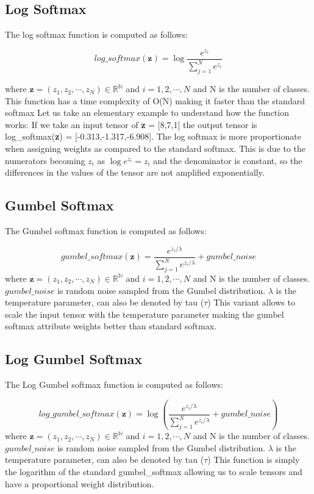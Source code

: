 \documentclass{article}
\begin{document}
\subsection{Log Softmax}
The log softmax function is computed as follows:

\[log\_softmax(\textbf{z}) = \log{\frac{e^{z_i}}{\sum_{j=1}^{N} e^{z_i}}}\]

where $\textbf{z} = (z_1,z_2,\cdots,z_N) \in \mathbb{R^N}$ and $i = 1,2,\cdots,N$ and N is the number of classes.
\newline
\newline
    This function has a time complexity of O(N) making it faster than the standard softmax
\newline
    Let us take an elementary example to understand how the function works:
    If we take an input tensor of \textbf{z} = [8,7,1] the output tensor is log\_softmax(\textbf{z}) = [-0.313,-1.317,-6.908]. The log softmax is more proportionate when assigning weights as compared to the standard softmax.
    This is due to the numerators becoming $z_i$ as $\log{e^{z_i} = z_i}$ and the denominator is constant, so the differences in the values of the tensor are not amplified exponentially.

\subsection{Gumbel Softmax}
The Gumbel softmax function is computed as follows:

\[gumbel\_softmax(\textbf{z}) = \frac{e^{z_i/\lambda}}{\sum_{j=1}^{N} e^{z_i/\lambda}} + gumbel\_noise\]
where $\textbf{z} = (z_1,z_2,\cdots,z_N) \in \mathbb{R^N}$ and $i = 1,2,\cdots,N$ and N is the number of classes. $gumbel\_noise$ is random noise sampled from the Gumbel distribution. $\lambda$ is the temperature parameter, can also be denoted by tau ($\tau$) 
\newline
\newline
    This variant allows to scale the input tensor with the temperature parameter
    making the gumbel softmax attribute weights better than standard softmax.

\subsection{Log Gumbel Softmax}
The Log Gumbel softmax function is computed as follows:

\[log\_gumbel\_softmax(\textbf{z}) = \log(\frac{e^{z_i/\lambda}}{\sum_{j=1}^{N} e^{z_i/\lambda}} + gumbel\_noise)\]
where $\textbf{z} = (z_1,z_2,\cdots,z_N) \in \mathbb{R^N}$ and $i = 1,2,\cdots,N$ and N is the number of classes. $gumbel\_noise$ is random noise sampled from the Gumbel distribution. $\lambda$ is the temperature parameter, can also be denoted by tau ($\tau$) 
\newline
\newline
This function is simply the logarithm of the standard gumbel\_softmax allowing us to scale tensors and have a proportional weight distribution.
    
\end{document}

